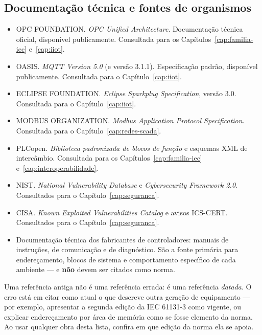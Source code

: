 \subsection{Documentação técnica e fontes de organismos}

\begin{itemize}[leftmargin=1.2cm, label={}]
  \item OPC FOUNDATION. \emph{OPC Unified Architecture}. Documentação técnica oficial, disponível
        publicamente. Consultada para os Capítulos~\ref{cap:familia-iec} e~\ref{cap:iiot}.
  \item OASIS. \emph{MQTT Version 5.0} (e versão 3.1.1). Especificação padrão, disponível
        publicamente. Consultada para o Capítulo~\ref{cap:iiot}.
  \item ECLIPSE FOUNDATION. \emph{Eclipse Sparkplug Specification}, versão 3.0. Consultada para o
        Capítulo~\ref{cap:iiot}.
  \item MODBUS ORGANIZATION. \emph{Modbus Application Protocol Specification}. Consultada para o
        Capítulo~\ref{cap:redes-scada}.
  \item PLCopen. \emph{Biblioteca padronizada de blocos de função} e esquemas XML de intercâmbio.
        Consultada para os Capítulos~\ref{cap:familia-iec} e~\ref{cap:interoperabilidade}.
  \item NIST. \emph{National Vulnerability Database} e \emph{Cybersecurity Framework 2.0}.
        Consultados para o Capítulo~\ref{cap:seguranca}.
  \item CISA. \emph{Known Exploited Vulnerabilities Catalog} e avisos ICS-CERT. Consultados para o
        Capítulo~\ref{cap:seguranca}.
  \item Documentação técnica dos fabricantes de controladores: manuais de instruções, de comunicação e
        de diagnóstico. São a fonte primária para endereçamento, blocos de sistema e comportamento
        específico de cada ambiente --- e \textbf{não} devem ser citados como norma.
\end{itemize}

\begin{atencao}
Uma referência antiga não é uma referência errada: é uma referência \emph{datada}. O erro está em citar
como atual o que descreve outra geração de equipamento --- por exemplo, apresentar a segunda edição da
IEC 61131-3 como vigente, ou explicar endereçamento por área de memória como se fosse elemento da
norma. Ao usar qualquer obra desta lista, confira em que edição da norma ela se apoia.
\end{atencao}

